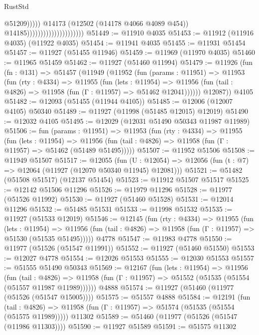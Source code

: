 \begin{lexlean}{RustStd}
\begin{coremodule}
                                                        @51209)))))
                                              @14173
                                              (@12502 (@14178 @4066 @4089 @454))
                                              @14185)))))))))))))))))))))
@51449 := @11910 @4035
@51453 := @11912 (@11916 @4035) (@11922 @4035)
@51454 := @11941 @4035
@51455 := @11931 @51454
@51457 := @11927 (@51455 @11946)
@51459 := @11969 (@11970 @4035)
@51460 := @11965 @51459
@51462 := @11927 (@51460 @11994)
@51479 := @11926
    (fun (fn : @131) =>
    @51457
      (@11949
        (@11952
          (fun (params : @11951) =>
          @11953
            (fun (rty : @4334) =>
            @11955
              (fun (lets : @11954) =>
              @11956 (fun (tail : @4826) => @11958 (fun (Γ : @11957) => @51462 @12041))))))
        @12087))
    @4105
@51482 := @12093 (@51455 (@11944 @4105))
@51485 := @12006 (@12007 @4105) @50340
@51489 := @11927 (@11998 (@51485 @12015) @12019)
@51490 := @12032 @4105
@51495 := @12029 (@12031 @51490 @50343 @11987 @11989)
@51506 := fun (params : @11951) =>
  @11953
    (fun (rty : @4334) =>
    @11955
      (fun (lets : @11954) =>
      @11956 (fun (tail : @4826) => @11958 (fun (Γ : @11957) => @51462 (@51489 @51495)))))
@51507 := @11952 @51506
@51508 := @11949 @51507
@51517 := @12055
    (fun (U : @12054) => @12056 (fun (t : @7) => @12064 (@11927 (@12070 @50340 @11945) @12081)))
@51521 := @51482 (@51508 @51517) (@12137 @51454)
@51523 := @11912 @51507 @51517
@51525 := @12142 @51506 @11296
@51526 := @11979 @11296
@51528 := @11977 (@51526 @11992)
@51530 := @11927 (@51460 @51528)
@51531 := @12014 @11296
@51532 := @51485 @51531
@51533 := @11998 @51532
@51535 := @11927 (@51533 @12019)
@51546 := @12145
    (fun (rty : @4334) =>
    @11955
      (fun (lets : @11954) =>
      @11956 (fun (tail : @4826) => @11958 (fun (Γ : @11957) => @51530 (@51535 @51495)))))
    @4778
@51547 := @11983 @4778
@51550 := @11977 (@51526 (@51547 @11991))
@51552 := @11927 (@51460 @51550)
@51553 := @12027 @4778
@51554 := @12026 @51553
@51555 := @12030 @51553
@51557 := @51555 @51490 @50343
@51569 := @12167
    (fun (lets : @11954) =>
    @11956
      (fun (tail : @4826) =>
      @11958 (fun (Γ : @11957) => @51552 (@51535 (@51554 (@51557 @11987 @11989))))))
    @4888
@51574 := @11927 (@51460 (@11977 (@51526 (@51547 @15005))))
@51575 := @51557 @4888
@51584 := @12191
    (fun (tail : @4826) => @11958 (fun (Γ : @11957) => @51574 (@51535 (@51554 (@51575 @11989)))))
    @11302
@51589 := @51460 (@11977 (@51526 (@51547 (@11986 @11303))))
@51590 := @11927 @51589
@51591 := @51575 @11302

\end{coremodule}
\end{lexlean}
